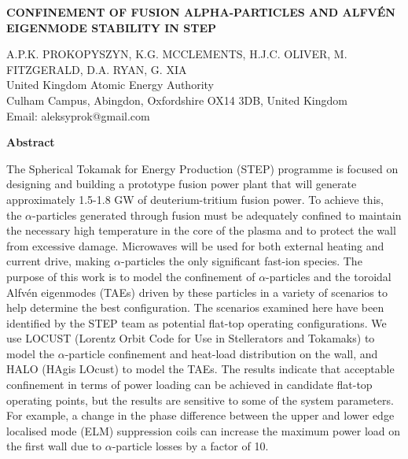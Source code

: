 \documentclass[10pt, a4paper, twoside]{article}
\begin{document}
\begin{flushleft}
\fontsize{12}{14}\selectfont \textbf{CONFINEMENT OF FUSION ALPHA-PARTICLES AND ALFV\'EN EIGENMODE STABILITY IN STEP}

\fontsize{10}{13}\selectfont
A.P.K. PROKOPYSZYN, K.G. MCCLEMENTS, H.J.C. OLIVER, M. FITZGERALD, D.A. RYAN, G. XIA \\
United Kingdom Atomic Energy Authority \\
Culham Campus, Abingdon, Oxfordshire OX14 3DB, United Kingdom \\
Email: aleksyprok@gmail.com

\end{flushleft}

\begin{flushleft}
\textbf{Abstract}
\end{flushleft}

\setlength{\parindent}{1cm}
\fontsize{9}{12}\selectfont

The Spherical Tokamak for Energy Production (STEP) programme is focused on designing and building a prototype fusion power plant that will generate approximately 1.5-1.8 GW of deuterium-tritium fusion power. To achieve this, the $\alpha$-particles generated through fusion must be adequately confined to maintain the necessary high temperature in the core of the plasma and to protect the wall from excessive damage. Microwaves will be used for both external heating and current drive, making $\alpha$-particles the only significant fast-ion species. The purpose of this work is to model the confinement of $\alpha$-particles and the toroidal Alfvén eigenmodes (TAEs) driven by these particles in a variety of scenarios to help determine the best configuration. The scenarios examined here have been identified by the STEP team as potential flat-top operating configurations. We use LOCUST (Lorentz Orbit Code for Use in Stellerators and Tokamaks) to model the $\alpha$-particle confinement and heat-load distribution on the wall, and HALO (HAgis LOcust) to model the TAEs. The results indicate that acceptable confinement in terms of power loading can be achieved in candidate flat-top operating points, but the results are sensitive to some of the system parameters. For example, a change in the phase difference between the upper and lower edge localised mode (ELM) suppression coils can increase the maximum power load on the first wall due to $\alpha$-particle losses by a factor of 10.
\end{document}
